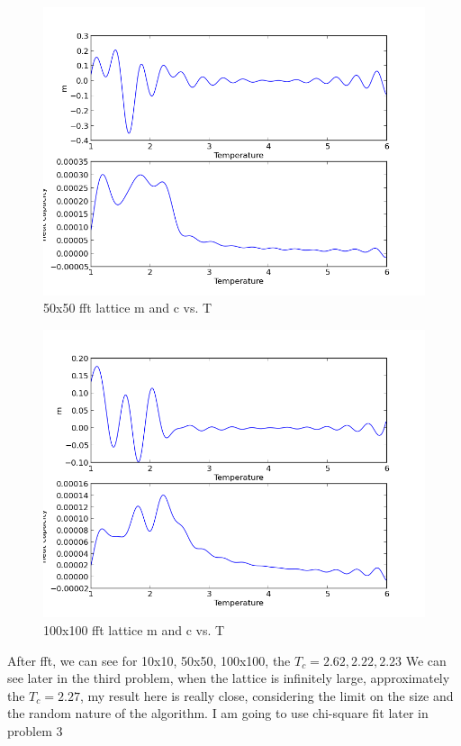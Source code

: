 \documentclass[11pt,letterpaper]{article}
\begin{document}
\begin{figure}
\begin{center}
\includegraphics[width=0.8\linewidth,angle=0]{p2fft.png}
\caption{50x50 fft lattice m and c vs. T}
\label{figure8}
\end{center}
\end{figure}

\begin{figure}
\begin{center}
\includegraphics[width=0.8\linewidth,angle=0]{p2fft100.png}
\caption{100x100 fft lattice m and c vs. T}
\label{figure9}
\end{center}
\end{figure}

After fft, we can see for 10x10, 50x50, 100x100, the $T_c=2.62,2.22,2.23$ We can see later in the third problem, when the lattice is infinitely large, approximately the $T_c=2.27$, my result here is really close, considering the limit on the size and the random nature of the algorithm. I am going to use chi-square fit later in problem 3
\end{document}
